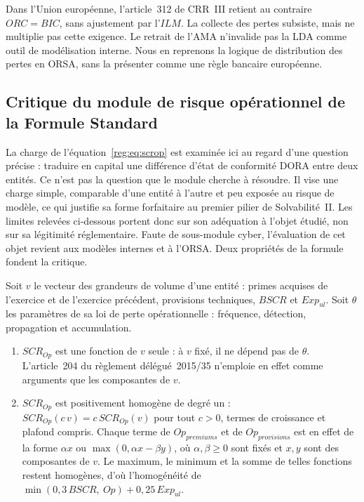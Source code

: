 Dans l'Union européenne, l'article~312 de CRR~III retient au contraire $ORC=BIC$, sans ajustement
par l'$ILM$. La collecte des pertes subsiste, mais ne multiplie pas cette exigence. Le retrait de
l'AMA n'invalide pas la LDA comme outil de modélisation interne. Nous en reprenons la logique de
distribution des pertes en ORSA, sans la présenter comme une règle bancaire européenne.

\subsection{Critique du module de risque opérationnel de la Formule Standard}
\label{subsec:critique-formule-standard}

La charge de l'équation~\eqref{reg:eq:scrop} est examinée ici au regard d'une question précise :
traduire en capital une différence d'état de conformité DORA entre deux entités. Ce n'est pas la
question que le module cherche à résoudre. Il vise une charge simple, comparable d'une entité à
l'autre et peu exposée au risque de modèle, ce qui justifie sa forme forfaitaire au premier pilier de Solvabilité~II. Les
limites relevées ci-dessous portent donc sur son adéquation à l'objet étudié, non sur sa légitimité
réglementaire. Faute de sous-module cyber, l'évaluation de cet objet revient aux modèles internes
et à l'ORSA. Deux propriétés de la formule fondent la critique.

Soit $v$ le vecteur des grandeurs de volume d'une entité : primes acquises de l'exercice et de
l'exercice précédent, provisions techniques, $BSCR$ et $Exp_{ul}$. Soit $\theta$ les paramètres
de sa loi de perte opérationnelle : fréquence, détection, propagation et accumulation.
\begin{enumerate}[label=(\roman*)]
\item $SCR_{Op}$ est une fonction de $v$ seule : à $v$ fixé, il ne dépend pas de $\theta$. L'article~204 du règlement délégué~2015/35 n'emploie en effet comme arguments que les composantes de $v$.
\item $SCR_{Op}$ est positivement homogène de degré un : $SCR_{Op}(c\,v)=c\,SCR_{Op}(v)$ pour tout
$c>0$, termes de croissance et plafond compris. Chaque terme de $Op_{premiums}$ et de $Op_{provisions}$ est en effet de la forme $\alpha x$ ou
$\max(0,\alpha x-\beta y)$, où $\alpha,\beta\ge0$ sont fixés et $x,y$ sont des composantes de $v$. Le maximum, le minimum et la somme de telles
fonctions restent homogènes, d'où l'homogénéité de $\min(0{,}3\,BSCR,\ Op)+0{,}25\,Exp_{ul}$.
\end{enumerate}

